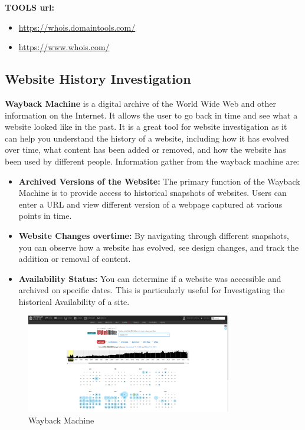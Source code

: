 \documentclass[11pt]{article}
\begin{document}
\textbf{TOOLS url:} 
\begin{itemize}
    \item \url{https://whois.domaintools.com/}
    \item \url{https://www.whois.com/}
\end{itemize}

\subsection{\textbf{Website History Investigation}}
\textbf{Wayback Machine} is a digital archive of the World Wide Web and other information on the Internet. It allows the user to go back in time and see what a website looked like in the past. It is a great tool for website investigation as it can help you understand the history of a website, including how it has evolved over time, what content has been added or removed, and how the website has been used by different people. Information gather from the wayback machine are:
\begin{itemize}
    \item \textbf{Archived Versions of the Website:} The primary function of the Wayback Machine is to provide access to historical snapshots of websites. Users can enter a URL and view different version of a webpage captured at various points in time.
    \item \textbf{Website Changes overtime:} By navigating through different snapshots, you can observe how a website has evolved, see design changes, and track the addition or removal of content.
    \item \textbf{Availability Status:} You can determine if a website was accessible and archived on specific dates. This is particularly useful for Investigating the historical Availability of a site. 
\end{itemize}

\begin{figure}[H]
    \centering
    \includegraphics[width=0.8\textwidth]{./imgs/Wayback Machine.png}
    \caption{Wayback Machine}
    \label{fig:wayback}
\end{figure}
\end{document}
